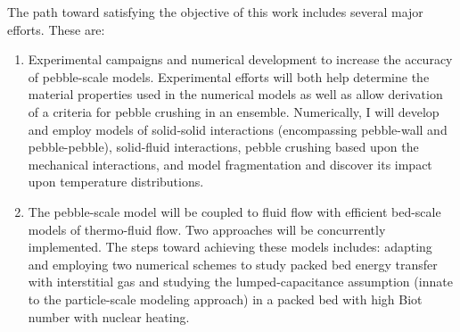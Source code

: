 The path toward satisfying the objective of this work includes several major efforts. These are:
\begin{enumerate}
\item {
    Experimental campaigns and numerical development to increase the accuracy of pebble-scale models. Experimental efforts will both help determine the material properties used in the numerical models as well as allow derivation of a criteria for pebble crushing in an ensemble. Numerically, I will develop and employ models of solid-solid interactions (encompassing pebble-wall and pebble-pebble), solid-fluid interactions, pebble crushing based upon the mechanical interactions, and model fragmentation and discover its impact upon temperature distributions.
}
\item {
    The pebble-scale model will be coupled to fluid flow with efficient bed-scale models of thermo-fluid flow. Two approaches will be concurrently implemented. The steps toward achieving these models includes: adapting and employing two numerical schemes to study packed bed energy transfer with interstitial gas and studying the lumped-capacitance assumption (innate to the particle-scale modeling approach) in a packed bed with high Biot number with nuclear heating.
}
\end{enumerate}



